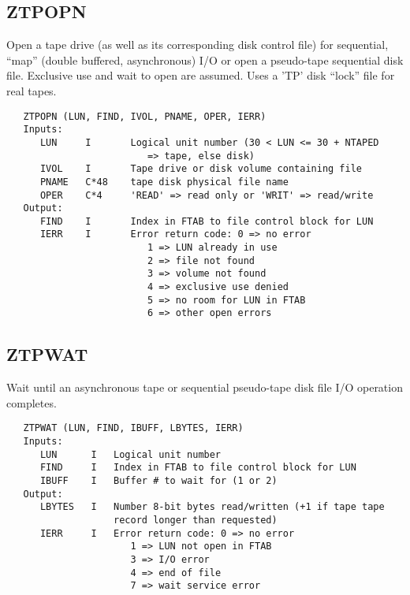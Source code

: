 \subsection{ZTPOPN}
Open a tape drive (as well as its corresponding disk control file)
for sequential, ``map'' (double buffered, asynchronous) I/O or open
a pseudo-tape sequential disk file.  Exclusive use and wait to open
are assumed.  Uses a 'TP' disk ``lock'' file for real tapes.
\begin{verbatim}
   ZTPOPN (LUN, FIND, IVOL, PNAME, OPER, IERR)
   Inputs:
      LUN     I       Logical unit number (30 < LUN <= 30 + NTAPED
                         => tape, else disk)
      IVOL    I       Tape drive or disk volume containing file
      PNAME   C*48    tape disk physical file name
      OPER    C*4     'READ' => read only or 'WRIT' => read/write
   Output:
      FIND    I       Index in FTAB to file control block for LUN
      IERR    I       Error return code: 0 => no error
                         1 => LUN already in use
                         2 => file not found
                         3 => volume not found
                         4 => exclusive use denied
                         5 => no room for LUN in FTAB
                         6 => other open errors

\end{verbatim}

\subsection{ZTPWAT}
Wait until an asynchronous tape or sequential pseudo-tape disk file
I/O operation completes.
\begin{verbatim}
   ZTPWAT (LUN, FIND, IBUFF, LBYTES, IERR)
   Inputs:
      LUN      I   Logical unit number
      FIND     I   Index in FTAB to file control block for LUN
      IBUFF    I   Buffer # to wait for (1 or 2)
   Output:
      LBYTES   I   Number 8-bit bytes read/written (+1 if tape tape
                   record longer than requested)
      IERR     I   Error return code: 0 => no error
                      1 => LUN not open in FTAB
                      3 => I/O error
                      4 => end of file
                      7 => wait service error

\end{verbatim}

